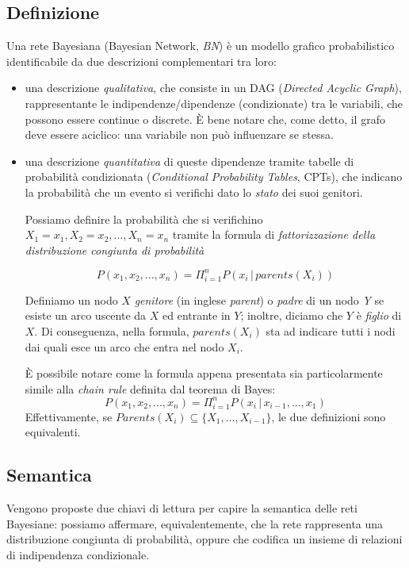 \subsection{Definizione}
Una rete Bayesiana (Bayesian Network, \textit{BN}) è un modello grafico probabilistico identificabile da due descrizioni complementari tra loro\cite{messaoud2012}:
\begin{itemize}
\item una descrizione \textit{qualitativa}, che consiste in un DAG (\textit{Directed Acyclic Graph}), rappresentante le indipendenze/dipendenze (condizionate) tra le variabili, che possono essere continue o discrete\cite{stella2009}. È bene notare che, come detto, il grafo deve essere aciclico: una variabile non può influenzare se stessa.
\item una descrizione \textit{quantitativa} di queste dipendenze tramite tabelle di probabilità condizionata (\textit{Conditional Probability Tables}, CPTs), che indicano la probabilità che un evento si verifichi dato lo \textit{stato} dei suoi genitori.

Possiamo definire la probabilità che si verifichino $X_1=x_1, X_2 = x_2, ..., X_n = x_n$ tramite la formula di \textit{fattorizzazione della distribuzione congiunta di probabilità}\cite{stella2009}

\begin{equation}
P(x_1, x_2, ..., x_n) = \Pi_{i=1}^{n} P(x_i \, | \, parents(X_i))
\end{equation}

Definiamo un nodo $X$ \textit{genitore} (in inglese \textit{parent}) o \textit{padre} di un nodo \textit{Y} se esiste un arco uscente da $X$ ed entrante in $Y$; inoltre, diciamo che $Y$ è \textit{figlio} di $X$. Di conseguenza, nella formula, $parents(X_i)$ sta ad indicare tutti i nodi dai quali esce un arco che entra nel nodo $X_i$.
		
È possibile notare come la formula appena presentata sia particolarmente simile alla \textit{chain rule} definita dal teorema di Bayes: 
\begin{equation}
	P(x_1, x_2, ..., x_n) = \Pi_{i=1}^{n} P(x_i \, | \, x_{i-1}, ..., x_1)
\end{equation}
Effettivamente, se $Parents(X_i) \subseteq \{X_1, ..., X_{i-1}\}$, le due definizioni sono equivalenti.\cite{stella2009}
\end{itemize}

\subsection{Semantica}
Vengono proposte due chiavi di lettura per capire la semantica delle reti Bayesiane: possiamo affermare, equivalentemente, che la rete rappresenta una distribuzione congiunta di probabilità, oppure che codifica un insieme di relazioni di indipendenza condizionale.\cite{stella2009}

